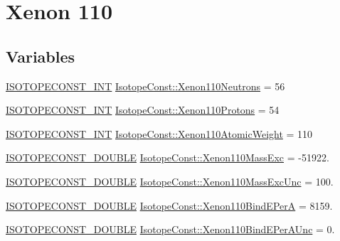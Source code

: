 \hypertarget{group___isotope_const-_xenon-_xe110}{}\section{Xenon 110}
\label{group___isotope_const-_xenon-_xe110}
\subsection*{Variables}
\begin{DoxyCompactItemize}
\item 
\mbox{\hyperlink{group___isotope_const-_macros_ga5f18360b3e99483a35c32d789e62621c}{I\+S\+O\+T\+O\+P\+E\+C\+O\+N\+S\+T\+\_\+\+I\+NT}} \mbox{\hyperlink{group___isotope_const-_xenon-_xe110_ga39aab178bcfa38ea31c9e134731545ad}{Isotope\+Const\+::\+Xenon110\+Neutrons}} = 56
\item 
\mbox{\hyperlink{group___isotope_const-_macros_ga5f18360b3e99483a35c32d789e62621c}{I\+S\+O\+T\+O\+P\+E\+C\+O\+N\+S\+T\+\_\+\+I\+NT}} \mbox{\hyperlink{group___isotope_const-_xenon-_xe110_ga75d7edfc531fdb416aa352b7b1328c2e}{Isotope\+Const\+::\+Xenon110\+Protons}} = 54
\item 
\mbox{\hyperlink{group___isotope_const-_macros_ga5f18360b3e99483a35c32d789e62621c}{I\+S\+O\+T\+O\+P\+E\+C\+O\+N\+S\+T\+\_\+\+I\+NT}} \mbox{\hyperlink{group___isotope_const-_xenon-_xe110_ga46f97c465952c3c54fa7c26342f72884}{Isotope\+Const\+::\+Xenon110\+Atomic\+Weight}} = 110
\item 
\mbox{\hyperlink{group___isotope_const-_macros_ga8f45a7272ce02c0b4c65c44636ed719a}{I\+S\+O\+T\+O\+P\+E\+C\+O\+N\+S\+T\+\_\+\+D\+O\+U\+B\+LE}} \mbox{\hyperlink{group___isotope_const-_xenon-_xe110_gaa3b1024e2031e6767879d8f1f9e0a0cc}{Isotope\+Const\+::\+Xenon110\+Mass\+Exc}} = -\/51922.
\item 
\mbox{\hyperlink{group___isotope_const-_macros_ga8f45a7272ce02c0b4c65c44636ed719a}{I\+S\+O\+T\+O\+P\+E\+C\+O\+N\+S\+T\+\_\+\+D\+O\+U\+B\+LE}} \mbox{\hyperlink{group___isotope_const-_xenon-_xe110_ga23d511be8c9ae7660863f9a9e7dc1c86}{Isotope\+Const\+::\+Xenon110\+Mass\+Exc\+Unc}} = 100.
\item 
\mbox{\hyperlink{group___isotope_const-_macros_ga8f45a7272ce02c0b4c65c44636ed719a}{I\+S\+O\+T\+O\+P\+E\+C\+O\+N\+S\+T\+\_\+\+D\+O\+U\+B\+LE}} \mbox{\hyperlink{group___isotope_const-_xenon-_xe110_ga7b5ff3cb1db6e2f24dbf1812ce1a6801}{Isotope\+Const\+::\+Xenon110\+Bind\+E\+PerA}} = 8159.
\item 
\mbox{\hyperlink{group___isotope_const-_macros_ga8f45a7272ce02c0b4c65c44636ed719a}{I\+S\+O\+T\+O\+P\+E\+C\+O\+N\+S\+T\+\_\+\+D\+O\+U\+B\+LE}} \mbox{\hyperlink{group___isotope_const-_xenon-_xe110_ga6da6ac4b7350a8da2189f91346c5b0a9}{Isotope\+Const\+::\+Xenon110\+Bind\+E\+Per\+A\+Unc}} = 0.

\end{DoxyCompactItemize}
